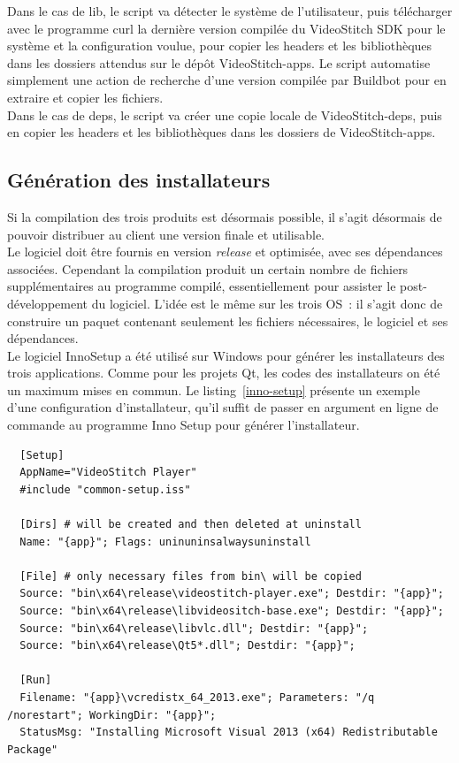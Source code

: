 Dans le cas de lib, le script va détecter le système de l'utilisateur, puis télécharger avec le programme curl
la dernière version compilée du VideoStitch SDK pour le système et la configuration voulue, pour copier
les headers et les bibliothèques dans les dossiers attendus sur le dépôt VideoStitch-apps.
Le script automatise simplement une action de recherche d'une version compilée par Buildbot
pour en extraire et copier les fichiers.\\
Dans le cas de deps, le script va créer une copie locale de VideoStitch-deps, puis
en copier les headers et les bibliothèques dans les dossiers de VideoStitch-apps.

\subsection{Génération des installateurs}
Si la compilation des trois produits est désormais possible, il s'agit désormais
de pouvoir distribuer au client une version finale et utilisable.\\
Le logiciel doit être fournis en version \textit{release} et optimisée, avec ses dépendances associées.
Cependant la compilation produit un certain nombre de fichiers supplémentaires au 
programme compilé, essentiellement pour assister le post-développement du logiciel. 
L'idée est le même sur les trois OS~: il s'agit donc de construire un paquet contenant 
seulement les fichiers nécessaires, le logiciel et ses dépendances.\\
\newline
Le logiciel InnoSetup a été utilisé sur Windows pour générer les installateurs 
des trois applications. Comme pour les projets Qt, les codes des installateurs
on été un maximum mises en commun. Le listing~\ref{inno-setup} présente un exemple
d'une configuration d'installateur, qu'il suffit de passer en argument en ligne
de commande au programme Inno Setup pour générer l'installateur.
\begin{listing}
  \begin{verbatim}
  [Setup]
  AppName="VideoStitch Player"
  #include "common-setup.iss"

  [Dirs] # will be created and then deleted at uninstall
  Name: "{app}"; Flags: uninuninsalwaysuninstall

  [File] # only necessary files from bin\ will be copied
  Source: "bin\x64\release\videostitch-player.exe"; Destdir: "{app}";
  Source: "bin\x64\release\libvideositch-base.exe"; Destdir: "{app}";
  Source: "bin\x64\release\libvlc.dll"; Destdir: "{app}";
  Source: "bin\x64\release\Qt5*.dll"; Destdir: "{app}";

  [Run]
  Filename: "{app}\vcredistx_64_2013.exe"; Parameters: "/q /norestart"; WorkingDir: "{app}";
  StatusMsg: "Installing Microsoft Visual 2013 (x64) Redistributable Package"
  \end{verbatim}
  \caption{Extrait de la configuration de l'installateur de VideoStitch Player}
  \label{inno-setup}
\end{listing}
